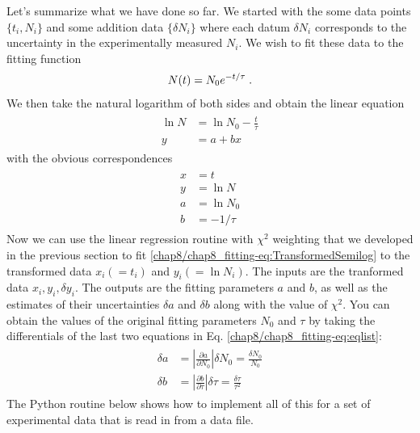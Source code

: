 \documentclass[letterpaper,10pt,english]{sphinxmanual}
\begin{document}
Let's summarize what we have done so far.  We started with the some data points $\{t_i,N_i\}$ and some addition data $\{\delta N_i\}$ where each datum $\delta N_i$ corresponds to the uncertainty in the experimentally measured $N_i$.  We wish to fit these data to the fitting function
\begin{gather}
\begin{split}N(t) = N_0 e^{-t/\tau} \;.\end{split}\notag
\end{gather}
We then take the natural logarithm of both sides and obtain the linear equation
\label{chap8/chap8_fitting:equation-eq:TransformedSemilog}\begin{gather}
\begin{split}\ln N &= \ln N_{0} -\frac{t}{\tau} \\
y &= a + bx\end{split}\label{chap8/chap8_fitting-eq:TransformedSemilog}
\end{gather}
with the obvious correspondences
\label{chap8/chap8_fitting:equation-eq:eqlist}\begin{gather}
\begin{split}x &= t\\
y &= \ln N\\
a &= \ln N_{0}\\
b &= -1/\tau\end{split}\label{chap8/chap8_fitting-eq:eqlist}
\end{gather}
Now we can use the linear regression routine with $\chi^2$ weighting that we developed in the previous section to fit  \eqref{chap8/chap8_fitting-eq:TransformedSemilog} to the transformed data $x_i (= t_i)$ and  $y_i (= \ln N_i)$.  The inputs are the tranformed data ${x_i}, {y_i}, {\delta y_i}$.  The outputs are the fitting parameters $a$ and $b$, as well as the estimates of their uncertainties $\delta a$ and $\delta b$ along with the value of $\chi^2$.  You can obtain the values of the original fitting parameters $N_0$ and $\tau$ by taking the differentials of the last two equations in Eq. \eqref{chap8/chap8_fitting-eq:eqlist}:
\label{chap8/chap8_fitting:equation-eq:paramunc}\begin{gather}
\begin{split}\delta a &= \left|\frac{\partial a}{\partial N_0}\right|\delta N_0
          = \frac{\delta N_{0}}{N_{0}}\\
\delta b &= \left|\frac{\partial b}{\partial \tau}\right|\delta \tau
          = \frac{\delta \tau}{\tau^2}\end{split}\label{chap8/chap8_fitting-eq:paramunc}
\end{gather}
The Python routine below shows how to implement all of this for a set of experimental data that is read in from a data file.
\end{document}
